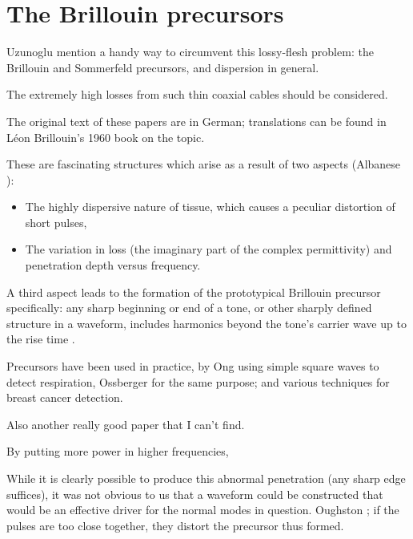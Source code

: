 \documentclass[paper.tex]{subfiles}
\begin{document}
\pagebreak
\section{The Brillouin precursors}

Uzunoglu \cite{Theoretical2020} mention a handy way to circumvent this lossy-flesh problem: the Brillouin and Sommerfeld precursors, and dispersion in general.


The extremely high losses from such thin coaxial cables should be considered.

The original text of these papers are in German; translations can be found in Léon Brillouin's 1960 
book\cite{Wave1960} on the topic. \footnotemark

These are fascinating structures which arise as a result of two aspects (Albanese 
\cite{Shortrisetime1989}): 

\begin{itemize}
	\item The highly dispersive nature of tissue, which causes a peculiar distortion of short pulses,
	\item The variation in loss (the imaginary part of the complex permittivity) and penetration depth versus frequency. 
\end{itemize}

A third aspect leads to the formation of the prototypical Brillouin precursor specifically: any sharp 
beginning or end of a tone, or other sharply defined structure in a waveform, includes harmonics beyond the tone's carrier wave up to the rise time \footnotemark. 


Precursors have been used in practice, by Ong \cite{Detection2003} using simple square waves to detect respiration\footnotemark, Ossberger \cite{Noninvasive2004} for the same purpose; and various techniques for breast cancer detection. 


Also another really good paper that I can't find.


By putting more power in higher frequencies, 


While it is clearly possible to produce this abnormal penetration (any sharp edge suffices), it was not obvious to us that a waveform 
could be constructed that would be an effective driver for the normal modes in question. 
Oughston ; if the pulses are too close together, they distort the precursor thus formed.
\end{document}
